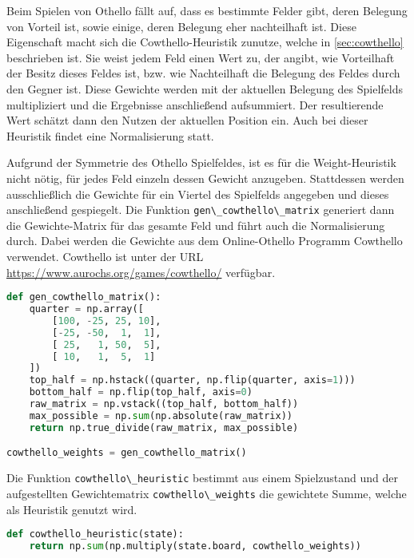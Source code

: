 Beim Spielen von Othello fällt auf, dass es bestimmte Felder gibt, deren
Belegung von Vorteil ist, sowie einige, deren Belegung eher nachteilhaft
ist. Diese Eigenschaft macht sich die Cowthello-Heuristik
\cite{cowthello} zunutze, welche in \ref{sec:cowthello} beschrieben ist.
Sie weist jedem Feld einen Wert zu, der angibt, wie Vorteilhaft der
Besitz dieses Feldes ist, bzw. wie Nachteilhaft die Belegung des Feldes
durch den Gegner ist. Diese Gewichte werden mit der aktuellen Belegung
des Spielfelds multipliziert und die Ergebnisse anschließend
aufsummiert. Der resultierende Wert schätzt dann den Nutzen der
aktuellen Position ein. Auch bei dieser Heuristik findet eine
Normalisierung statt.

Aufgrund der Symmetrie des Othello Spielfeldes, ist es für die
Weight-Heuristik nicht nötig, für jedes Feld einzeln dessen Gewicht
anzugeben. Stattdessen werden ausschließlich die Gewichte für ein
Viertel des Spielfelds angegeben und dieses anschließend gespiegelt. Die
Funktion \passthrough{\lstinline!gen\_cowthello\_matrix!} generiert dann
die Gewichte-Matrix für das gesamte Feld und führt auch die
Normalisierung durch. Dabei werden die Gewichte aus dem Online-Othello
Programm Cowthello \cite{cowthello} verwendet. Cowthello ist unter der
URL \url{https://www.aurochs.org/games/cowthello/} verfügbar.

\begin{lstlisting}[language=Python]
def gen_cowthello_matrix():
    quarter = np.array([
        [100, -25, 25, 10],
        [-25, -50,  1,  1],
        [ 25,   1, 50,  5],
        [ 10,   1,  5,  1]
    ])
    top_half = np.hstack((quarter, np.flip(quarter, axis=1)))
    bottom_half = np.flip(top_half, axis=0)
    raw_matrix = np.vstack((top_half, bottom_half))
    max_possible = np.sum(np.absolute(raw_matrix))
    return np.true_divide(raw_matrix, max_possible)

cowthello_weights = gen_cowthello_matrix()
\end{lstlisting}

Die Funktion \passthrough{\lstinline!cowthello\_heuristic!} bestimmt aus
einem Spielzustand und der aufgestellten Gewichtematrix
\passthrough{\lstinline!cowthello\_weights!} die gewichtete Summe,
welche als Heuristik genutzt wird.

\begin{lstlisting}[language=Python]
def cowthello_heuristic(state):
    return np.sum(np.multiply(state.board, cowthello_weights))
\end{lstlisting}

